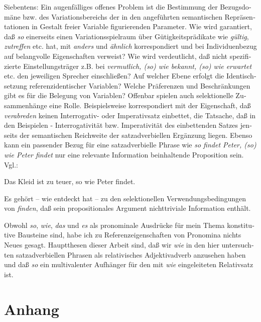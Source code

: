 \documentclass[output=paper, colorlinks, citecolor=brown, booklanguage=german]{langscibook}
\begin{document}
\begin{otherlanguage}{german}
Siebentens: Ein augenfälliges offenes Problem ist die Bestimmung der Bezugsdomäne bzw. des Variationsbereichs der in den angeführten semantischen Repräsentationen in Gestalt freier Variable figurierenden Parameter. Wie wird garantiert, daß \textit{so} einerseits einen Variationsspielraum über Gütigkeitsprädikate wie \textit{gültig}, \textit{zutreffen} etc. hat, mit \textit{anders} und \textit{ähnlich} korrespondiert und bei Individuenbezug auf belangvolle Eigenschaften verweist? Wie wird verdeutlicht, daß nicht spezifizierte Einstellungsträger z.B. bei \textit{vermutlich, (so) wie bekannt, (so) wie erwartet} etc. den jeweiligen Sprecher einschließen? Auf welcher Ebene erfolgt die Identischsetzung referenzidentischer Variablen? Welche Präferenzen und Beschränkungen gibt es für die Belegung von Variablen? Offenbar spielen auch selektionelle Zusammenhänge eine Rolle. Beispielsweise korrespondiert mit der Eigenschaft, daß \textit{verabreden} keinen Interrogativ- oder Imperativsatz einbettet, die Tatsache, daß in den Beispielen - Interrogativität bzw. Imperativität des einbettenden Satzes jenseits der semantischen Reichweite der satzadverbiellen Ergänzung liegen. Ebenso kann ein passender Bezug für eine satzadverbielle Phrase wie \textit{so findet Peter, (so) wie Peter findet} nur eine relevante Information beinhaltende Proposition sein. Vgl.:

\ea \label{ex:zi97:69} Das Kleid ist zu teuer, so wie Peter findet.
 \label{ex:zi97:70}
\z

\noindent Es gehört -- wie \citet{reis1993wer-findet-wird-suchen} entdeckt hat -- zu den selektionellen Verwendungsbedingungen von \textit{finden}, daß sein propositionales Argument nichttriviale Information enthält.

\largerpage
Obwohl \textit{so}, \textit{wie}, \textit{das} und \textit{es} als pronominale Ausdrücke für mein Thema konstitutive Bausteine sind, habe ich zu Referenzeigenschaften von Pronomina nichts Neues gesagt. Hauptthesen dieser Arbeit sind, daß wir \textit{wie} in den hier untersuchten satzadverbiellen Phrasen als relativisches Adjektivadverb anzusehen haben und daß \textit{so} ein multivalenter Aufhänger für den mit \textit{wie} eingeleiteten Relativsatz ist.

\section*{Anhang} \label{anhang}


\end{otherlanguage}
\end{document}
